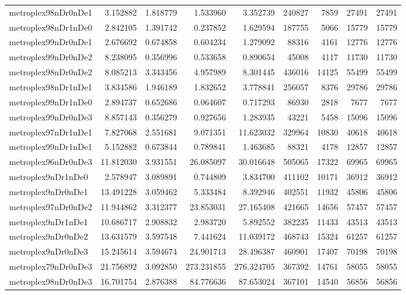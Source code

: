 \begin{longtable}{|l|r|r|r|r|r|r|r|r|}
metroplex98nDr0nDe1 & 3.152882 & 1.818779 & 1.533960 & 3.352739 & 240827 & 7859 & 27491 & 27491 \\
metroplex98nDr1nDe0 & 2.842105 & 1.391742 & 0.237852 & 1.629594 & 187755 & 5066 & 15779 & 15779 \\
metroplex99nDr0nDe1 & 2.676692 & 0.674858 & 0.604234 & 1.279092 & 88316 & 4161 & 12776 & 12776 \\
metroplex99nDr0nDe2 & 8.238095 & 0.356996 & 0.533658 & 0.890654 & 45008 & 4117 & 11730 & 11730 \\
metroplex98nDr0nDe2 & 8.085213 & 3.343456 & 4.957989 & 8.301445 & 436016 & 14125 & 55499 & 55499 \\
metroplex98nDr1nDe1 & 3.834586 & 1.946189 & 1.832652 & 3.778841 & 256057 & 8376 & 29786 & 29786 \\
metroplex99nDr1nDe0 & 2.894737 & 0.652686 & 0.064607 & 0.717293 & 86930 & 2818 & 7677 & 7677 \\
metroplex99nDr0nDe3 & 8.857143 & 0.356279 & 0.927656 & 1.283935 & 43221 & 5458 & 15096 & 15096 \\
metroplex97nDr1nDe1 & 7.827068 & 2.551681 & 9.071351 & 11.623032 & 329964 & 10830 & 40618 & 40618 \\
metroplex99nDr1nDe1 & 5.152882 & 0.673844 & 0.789841 & 1.463685 & 88321 & 4178 & 12857 & 12857 \\
metroplex96nDr0nDe3 & 11.812030 & 3.931551 & 26.085097 & 30.016648 & 505065 & 17322 & 69965 & 69965 \\
metroplex9nDr1nDe0 & 2.578947 & 3.089891 & 0.744809 & 3.834700 & 411102 & 10171 & 36912 & 36912 \\
metroplex9nDr0nDe1 & 13.491228 & 3.059462 & 5.333484 & 8.392946 & 402551 & 11932 & 45806 & 45806 \\
metroplex97nDr0nDe2 & 11.944862 & 3.312377 & 23.853031 & 27.165408 & 421665 & 14656 & 57457 & 57457 \\
metroplex9nDr1nDe1 & 10.686717 & 2.908832 & 2.983720 & 5.892552 & 382235 & 11433 & 43513 & 43513 \\
metroplex9nDr0nDe2 & 13.631579 & 3.597548 & 7.441624 & 11.039172 & 468743 & 15324 & 61257 & 61257 \\
metroplex9nDr0nDe3 & 15.245614 & 3.594674 & 24.901713 & 28.496387 & 460901 & 17407 & 70198 & 70198 \\
metroplex79nDr0nDe3 & 21.756892 & 3.092850 & 273.231855 & 276.324705 & 367392 & 14761 & 58055 & 58055 \\
metroplex98nDr0nDe3 & 16.701754 & 2.876388 & 84.776636 & 87.653024 & 367101 & 14540 & 56856 & 56856 \\
\end{longtable}
